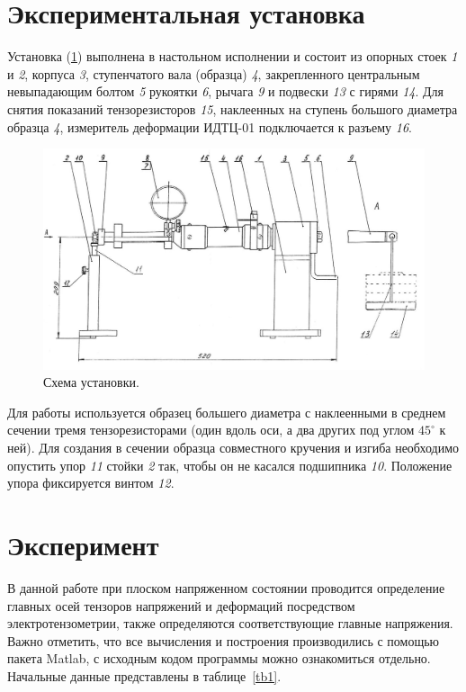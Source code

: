 \documentclass[12pt, a4paper]{article}
\begin{document}
    \newpage
    
    \section{Экспериментальная установка}
    
    Установка (\ref{im1}) выполнена в настольном исполнении и состоит из опорных стоек \textit{1} и \textit{2}, корпуса \textit{3}, ступенчатого вала (образца) \textit{4}, закрепленного центральным невыпадающим болтом \textit{5} рукоятки \textit{6}, рычага \textit{9} и подвески \textit{13} с гирями \textit{14}. Для снятия показаний тензорезисторов \textit{15}, наклеенных на ступень большого диаметра образца \textit{4}, измеритель деформации ИДТЦ-01 подключается к разъему \textit{16}.
    
    \begin{figure}[h]
        \centering
        \includegraphics[width = 15cm]{image_1.jpg}
        \caption{Схема установки.}
        \label{im1}
    \end{figure}
    
    Для работы используется образец большего диаметра с наклеенными в среднем сечении тремя тензорезисторами (один вдоль оси, а два других под углом $45^{\circ}$ к ней). Для создания в сечении образца совместного кручения и изгиба необходимо опустить упор \textit{11} стойки \textit{2} так, чтобы он не касался подшипника \textit{10}. Положение упора фиксируется винтом \textit{12}.
    
    \newpage
    
    \section{Эксперимент}
    
    В данной работе при плоском напряженном состоянии проводится определение главных осей тензоров напряжений и деформаций посредством электротензометрии, также определяются соответствующие главные напряжения. Важно отметить, что все вычисления и построения производились с помощью пакета Matlab, с исходным кодом программы можно ознакомиться отдельно. Начальные данные представлены в таблице~\ref{tb1}.
    
\end{document}
